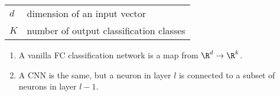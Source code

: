 
\begin{tabular}{l|l}
  $d$ & dimension of an input vector \\
  $K$ & number of output classification classes \\
\end{tabular}


\begin{enumerate}
\item A vanilla FC classification network is a map from $\R^d \to \R^k$.
\item A CNN is the same, but a neuron in layer $l$ is connected to a subset of neurons in layer $l-1$.
\end{enumerate}

